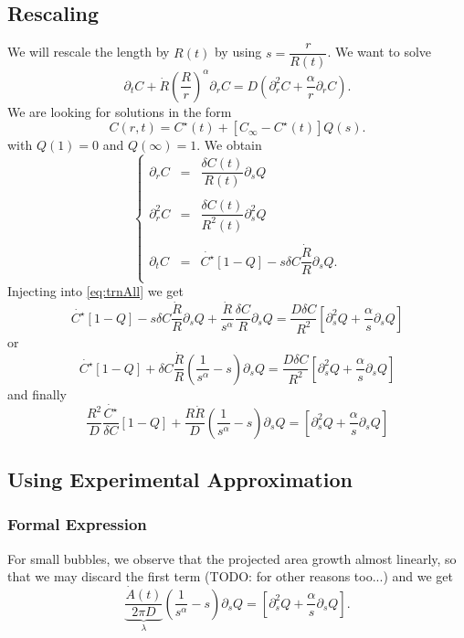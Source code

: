 \documentclass[11pt]{revtex4}
\begin{document}
\subsection{Rescaling}
We will rescale the length by $R(t)$ by using $s=\dfrac{r}{R(t)}$.
We want to solve
\begin{equation}
	\label{eq:trnAll}
	\partial_t C + \dot{R}\left(\dfrac{R}{r}\right)^\alpha \partial_r C = D\left(\partial_r^2 C+ \dfrac{\alpha}{r} \partial_r C \right).
\end{equation}
We are looking for solutions in the form
\begin{equation}
	C(r,t) = C^\star(t) + \left[ C_\infty - C^\star(t)\right] Q(s).
\end{equation}
with $Q(1)=0$ and $Q(\infty)=1$.
We obtain
$$
	\left\lbrace
	\begin{array}{rcl}
	\partial_r C   & = & \dfrac{\delta C(t)}{R(t)}\partial_s Q\\
	\\
	\partial_r^2 C & = & \dfrac{\delta C(t)}{R^2(t)}\partial_s^2 Q\\
	\\
	\partial_t  C  & = & \dot{C^\star}\left[1-Q\right] - s \delta C  \dfrac{\dot{R}}{R} \partial_s Q.\\
	\end{array}
	\right.
$$
Injecting into \eqref{eq:trnAll} we get
$$
	\dot{C^\star}\left[1-Q\right] - s \delta C  \dfrac{\dot{R}}{R} \partial_s Q
	+ \dfrac{\dot{R}}{s^\alpha}  \dfrac{\delta C}{R}\partial_s Q = \dfrac{D\delta C}{R^2}\left[ \partial_s^2 Q + \dfrac{\alpha}{s}\partial_s Q\right]
$$
or
$$
	\dot{C^\star}\left[1-Q\right] + \delta C \dfrac{\dot{R}}{R} \left( \dfrac{1}{s^\alpha} -s \right) \partial_s Q = \dfrac{D\delta C}{R^2}\left[ \partial_s^2 Q + \dfrac{\alpha}{s}\partial_s Q\right]
$$
and finally
\begin{equation}
	\dfrac{R^2}{D} \dfrac{\dot{C^\star}}{\delta C} \left[1-Q\right] + \dfrac{R\dot{R}}{D} \left( \dfrac{1}{s^\alpha} -s \right) \partial_s Q = \left[ \partial_s^2 Q + \dfrac{\alpha}{s}\partial_s Q\right]
\end{equation}

\subsection{Using Experimental Approximation}
\subsubsection{Formal Expression}
For small bubbles, we observe that the projected area growth almost linearly, so that we may discard the first term (TODO: for other reasons too...)
and we get
\begin{equation}
	\underbrace{\dfrac{\dot{A}(t)}{2\pi D}}_{\lambda} \left( \dfrac{1}{s^\alpha} -s \right) \partial_s Q = \left[ \partial_s^2 Q + \dfrac{\alpha}{s}\partial_s Q\right].
\end{equation}
\end{document}

